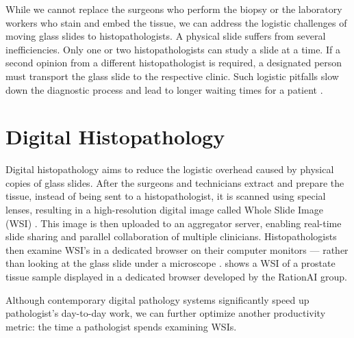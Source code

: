 While we cannot replace the surgeons who perform the biopsy or the laboratory workers who stain and embed the tissue, we can address the logistic challenges of moving glass slides to histopathologists.
A physical slide suffers from several inefficiencies. 
Only one or two histopathologists can study a slide at a time.
If a second opinion from a different histopathologist is required, a designated person must transport the glass slide to the respective clinic.
Such logistic pitfalls slow down the diagnostic process and lead to longer waiting times for a patient \cite{from-traditional-to-digital-histopathology}.

\section{Digital Histopathology}

Digital histopathology aims to reduce the logistic overhead caused by physical copies of glass slides.
After the surgeons and technicians extract and prepare the tissue, instead of being sent to a histopathologist, it is scanned using special lenses, resulting in a high-resolution digital image called Whole Slide Image (WSI) \cite{from-traditional-to-digital-histopathology}.
This image is then uploaded to an aggregator server, enabling real-time slide sharing and parallel collaboration of multiple clinicians.
Histopathologists then examine WSI's in a dedicated browser on their computer monitors --- rather than looking at the glass slide under a microscope \cite{digital-histopathology-process}.  shows a WSI of a prostate tissue sample displayed in a dedicated browser developed by the RationAI group.

Although contemporary digital pathology systems significantly speed up pathologist's day-to-day work, we can further optimize another productivity metric: the time a pathologist spends examining WSIs.

